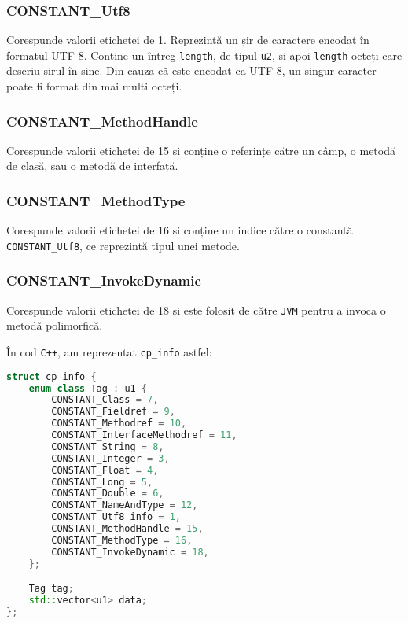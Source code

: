\subsubsection{CONSTANT\_Utf8}

Corespunde valorii etichetei de 1. Reprezintă un șir de caractere
encodat în formatul UTF-8. Conține un întreg \texttt{length}, de tipul
\texttt{u2}, și apoi \texttt{length} octeți care descriu șirul în sine.
Din cauza că este encodat ca UTF-8, un singur caracter poate fi format
din mai multi octeți.

\subsubsection{CONSTANT\_MethodHandle}

Corespunde valorii etichetei de 15 și conține o referințe către un câmp,
o metodă de clasă, sau o metodă de interfață.

\subsubsection{CONSTANT\_MethodType}

Corespunde valorii etichetei de 16 și conține un indice către o
constantă \texttt{CONSTANT\_Utf8}, ce reprezintă tipul unei metode.

\subsubsection{CONSTANT\_InvokeDynamic}

Corespunde valorii etichetei de 18 și este folosit de către \texttt{JVM}
pentru a invoca o metodă polimorfică.

În cod \texttt{C++}, am reprezentat \texttt{cp\_info} astfel:

\begin{lstlisting}[language=C++]
struct cp_info {
    enum class Tag : u1 {
        CONSTANT_Class = 7,
        CONSTANT_Fieldref = 9,
        CONSTANT_Methodref = 10,
        CONSTANT_InterfaceMethodref = 11,
        CONSTANT_String = 8,
        CONSTANT_Integer = 3,
        CONSTANT_Float = 4,
        CONSTANT_Long = 5,
        CONSTANT_Double = 6,
        CONSTANT_NameAndType = 12,
        CONSTANT_Utf8_info = 1,
        CONSTANT_MethodHandle = 15,
        CONSTANT_MethodType = 16,
        CONSTANT_InvokeDynamic = 18,
    };

    Tag tag;
    std::vector<u1> data;
};
\end{lstlisting}

